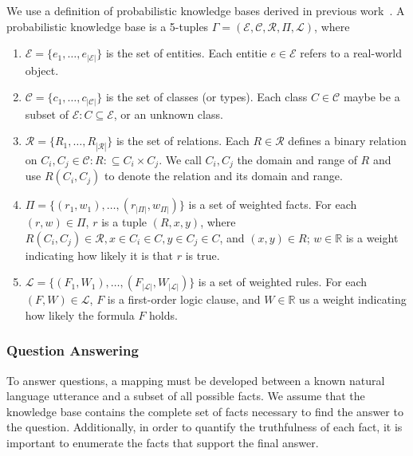 We use a definition of probabilistic knowledge bases derived in previous work~\cite{chen2014knowledge}.
A probabilistic knowledge base is a 5-tuples \(\Gamma = (\mathcal{E}, \mathcal{C}, \mathcal{R}, \Pi, \mathcal{L})\), where
\begin{enumerate}[itemsep=2pt,topsep=3pt,parsep=0pt,partopsep=0pt,
                  leftmargin=0pt,labelindent=0pt,itemindent=12pt]
\item \(\mathcal{E} = \{ e_1, \ldots, e_{|\mathcal{E}|} \} \) is the set of entities.
Each entitie \( e \in \mathcal{E} \) refers to a real-world object.

\item \(\mathcal{C} = \{ c_1, \ldots, c_{|\mathcal{C}|} \} \) is the set of classes (or types).
Each class \( C \in \mathcal{C} \) maybe be a subset of \(\mathcal{E} : C \subseteq \mathcal{E}\), or an unknown class.

\item \(\mathcal{R} = \{ R_1, \ldots, R_{|\mathcal{R}|} \} \) is the set of relations.
Each \(R \in \mathcal{R} \) defines a binary relation on \(C_i, C_j \in \mathcal{C}: R: \subseteq C_i \times C_j\).
We call \(C_i, C_j\) the domain and range of \(R\) and use \(R(C_i,C_j)\) to denote the relation and its domain and range.

\item \(\Pi = \{(r_1, w_1), \ldots, (r_{|\Pi|}, w_{\Pi|})\} \) is a set of weighted facts.
For each \( (r,w) \in \Pi\), \(r\) is a tuple  \((R,x,y)\),
where \(R(C_i,C_j) \in \mathcal{R}, x \in C_i \in C, y \in C_j \in C\), and \((x,y) \in R\);
\(w \in \mathbb{R}\) is a weight indicating how likely it is that \(r\) is true. 

\item \(\mathcal{L} = \{(F_1,W_1),\ldots, (F_{|\mathcal{L}|}, W_{|\mathcal{L}|}) \} \) is a set of weighted rules.
For each \((F, W) \in \mathcal{L} \), \(F\) is a first-order logic clause, and
\(W \in \mathbb{R} \) us a weight indicating how likely the formula \(F\)
holds. 

\end{enumerate}


\subsubsection{Question Answering}

To answer questions, a mapping must be developed between a known
natural language utterance and a subset of all possible facts.
We assume that the knowledge base contains the complete set of facts necessary
to find the answer to the question.
Additionally, in order to quantify the truthfulness of each fact, it is
important to enumerate the facts that support the final answer.


